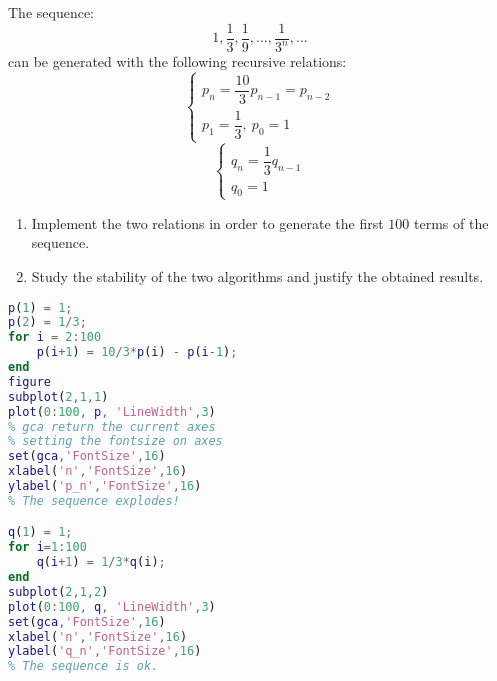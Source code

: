 \documentclass[12pt, a4paper]{report}
\newtheorem[style=M,bodystyle=\normalfont]{theorem}{Theorem}
\newtheorem[style=M,bodystyle=\normalfont]{corollary}{Corollary}
\newtheorem[style=M,bodystyle=\normalfont]{lemma}{Lemma}
\newtheorem[style=M,bodystyle=\normalfont]{definition}{Definition}
\begin{document}
    \begin{Exercise}[label=6]
        The sequence: 
        \[1, \dfrac{1}{3}, \dfrac{1}{9}, \dots, \dfrac{1}{3^n},\dots\]
        can be generated with the following recursive relations: 
        \[
        \begin{cases}
            p_n=\dfrac{10}{3}p_{n-1}=p_{n-2}  \\
            p_1 = \dfrac{1}{3}, \: p_0=1
        \end{cases}
        \]
        \[
        \begin{cases}
            q_n=\dfrac{1}{3}q_{n-1}  \\
            q_0=1
        \end{cases}
        \]
        \begin{enumerate}
            \item Implement the two relations in order to generate the first $100$ terms of the sequence.
            \item Study the stability of the two algorithms and justify the obtained results. 
        \end{enumerate}
    \end{Exercise}
    \begin{Answer}[ref=6]
        \begin{lstlisting}[language=Matlab]
p(1) = 1;
p(2) = 1/3;
for i = 2:100
    p(i+1) = 10/3*p(i) - p(i-1);
end
figure
subplot(2,1,1)
plot(0:100, p, 'LineWidth',3)
% gca return the current axes 
% setting the fontsize on axes
set(gca,'FontSize',16)
xlabel('n','FontSize',16)
ylabel('p_n','FontSize',16)
% The sequence explodes!

q(1) = 1;
for i=1:100
    q(i+1) = 1/3*q(i);
end
subplot(2,1,2)
plot(0:100, q, 'LineWidth',3)
set(gca,'FontSize',16)
xlabel('n','FontSize',16)
ylabel('q_n','FontSize',16)
% The sequence is ok.
        \end{lstlisting}
    \end{Answer}

\newpage
\end{document}
